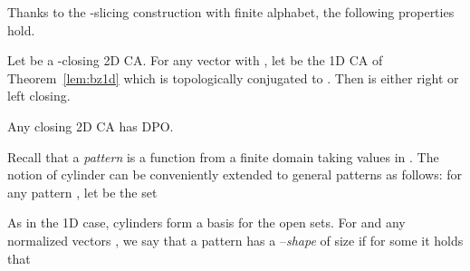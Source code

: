 \documentclass{llncs}
\begin{document}
Thanks to the -slicing construction with finite alphabet, the
following properties hold.
\begin{proposition}\label{lem:closing1d}
Let  be a -closing 2D CA. For any vector  with
, let  be the 1D CA of
Theorem~\ref{lem:bz1d} which is topologically conjugated to
.
Then  is either right or left closing.
\end{proposition}
\begin{theorem}\label{th:closingDPO}
  Any closing 2D CA has DPO.
\end{theorem}
\begin{comment}
We now deal with the relation between openness and closingness.
Recall that in 1D case, a CA is open if and only if it is both
left and right closing. In 2D settings, a weaker result holds,
namely that 4-closing 2D CA are open. We conjecture that also the
opposite relation is true.
\smallskip\\
Let  and  be two integer vectors. We give notions
and results assuming that  and
. Analogous results are obtained for the
other cases. For , , we say that a pattern
 has a -\emph{shape}  if
.
\begin{proposition}[\cite{dennunzio08,dennunzio09ja}]\label{prop:NEclosCasino}
   Consider a -closing 2D CA . Then, for all sufficiently
   large , any , and , if   and  are
   patterns of -shape 
   and , resp.,
   and , then
   for each pattern  of -shape  there exists a
   pattern  of -shape 
   such that
   
\end{proposition}
Proposition~\ref{prop:NEclosCasino} is useful to prove the
following result.
\end{comment}
Recall that a \emph{pattern}  is a function from a finite domain
 taking values in . The notion of cylinder
can be conveniently extended to general patterns as follows: for
any pattern , let  be the set

As in the 1D case, cylinders form a basis for the open sets.
For  and any normalized vectors ,
we say that a pattern  has a --\emph{shape} of size
 if for some  it holds that
 
\end{document}
